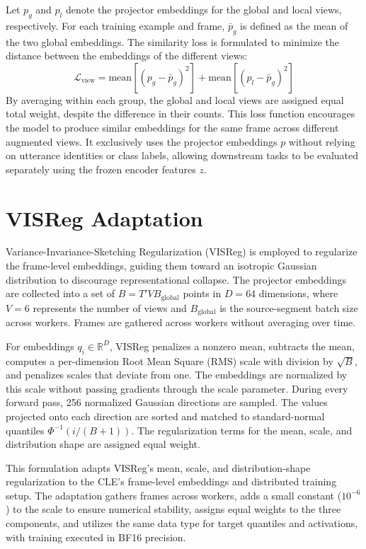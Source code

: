 Let $p_g$ and $p_l$ denote the projector embeddings for the global and local views, respectively. For each training example and frame, $\bar{p}_g$ is defined as the mean of the two global embeddings. The similarity loss is formulated to minimize the distance between the embeddings of the different views:
\begin{equation}
\mathcal{L}_{\text{view}} = \text{mean}\left[(p_g - \bar{p}_g)^2\right] + \text{mean}\left[(p_l - \bar{p}_g)^2\right]
\end{equation}
By averaging within each group, the global and local views are assigned equal total weight, despite the difference in their counts. This loss function encourages the model to produce similar embeddings for the same frame across different augmented views. It exclusively uses the projector embeddings $p$ without relying on utterance identities or class labels, allowing downstream tasks to be evaluated separately using the frozen encoder features $z$.

\section{VISReg Adaptation}
Variance-Invariance-Sketching Regularization (VISReg) is employed to regularize the frame-level embeddings, guiding them toward an isotropic Gaussian distribution to discourage representational collapse. The projector embeddings are collected into a set of $B = T'VB_{\text{global}}$ points in $D = 64$ dimensions, where $V = 6$ represents the number of views and $B_{\text{global}}$ is the source-segment batch size across workers. Frames are gathered across workers without averaging over time.

For embeddings $q_i \in \mathbb{R}^D$, VISReg penalizes a nonzero mean, subtracts the mean, computes a per-dimension Root Mean Square (RMS) scale with division by $\sqrt{B}$, and penalizes scales that deviate from one. The embeddings are normalized by this scale without passing gradients through the scale parameter. During every forward pass, 256 normalized Gaussian directions are sampled. The values projected onto each direction are sorted and matched to standard-normal quantiles $\Phi^{-1}(i/(B+1))$. The regularization terms for the mean, scale, and distribution shape are assigned equal weight. 

This formulation adapts VISReg’s mean, scale, and distribution-shape regularization to the CLE’s frame-level embeddings and distributed training setup. The adaptation gathers frames across workers, adds a small constant ($10^{-6}$) to the scale to ensure numerical stability, assigns equal weights to the three components, and utilizes the same data type for target quantiles and activations, with training executed in BF16 precision.

